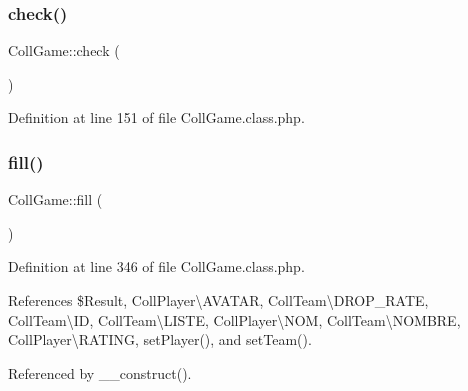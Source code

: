 \subsubsection{\texorpdfstring{check()}{check()}}
{\footnotesize\ttfamily Coll\+Game\+::check (\begin{DoxyParamCaption}{ }\end{DoxyParamCaption})}



Definition at line 151 of file Coll\+Game.\+class.\+php.

\mbox{\label{class_coll_game_aa5284af9c5db56f146e3c07fc0b71a8f}} 
\subsubsection{\texorpdfstring{fill()}{fill()}}
{\footnotesize\ttfamily Coll\+Game\+::fill (\begin{DoxyParamCaption}{ }\end{DoxyParamCaption})\hspace{0.3cm}{\ttfamily [protected]}}



Definition at line 346 of file Coll\+Game.\+class.\+php.



References \$\+Result, Coll\+Player\textbackslash{}\+A\+V\+A\+T\+AR, Coll\+Team\textbackslash{}\+D\+R\+O\+P\+\_\+\+R\+A\+TE, Coll\+Team\textbackslash{}\+ID, Coll\+Team\textbackslash{}\+L\+I\+S\+TE, Coll\+Player\textbackslash{}\+N\+OM, Coll\+Team\textbackslash{}\+N\+O\+M\+B\+RE, Coll\+Player\textbackslash{}\+R\+A\+T\+I\+NG, set\+Player(), and set\+Team().



Referenced by \+\_\+\+\_\+construct().

